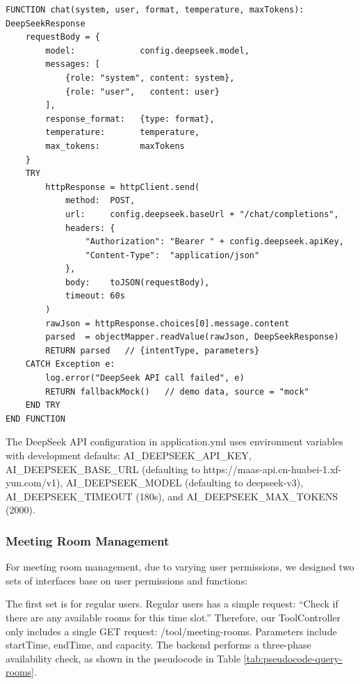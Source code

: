 \vspace{3mm}

\begin{table}[H]
\small\singlespacing
\centering
\caption{Pseudocode --- DeepSeekService.chat() LLM API Call with Fallback}
\label{tab:pseudocode-deepseek-chat}
\vspace{2mm}

\begin{lstlisting}
FUNCTION chat(system, user, format, temperature, maxTokens): DeepSeekResponse
    requestBody = {
        model:             config.deepseek.model,
        messages: [
            {role: "system", content: system},
            {role: "user",   content: user}
        ],
        response_format:   {type: format},
        temperature:       temperature,
        max_tokens:        maxTokens
    }
    TRY
        httpResponse = httpClient.send(
            method:  POST,
            url:     config.deepseek.baseUrl + "/chat/completions",
            headers: {
                "Authorization": "Bearer " + config.deepseek.apiKey,
                "Content-Type":  "application/json"
            },
            body:    toJSON(requestBody),
            timeout: 60s
        )
        rawJson = httpResponse.choices[0].message.content
        parsed  = objectMapper.readValue(rawJson, DeepSeekResponse)
        RETURN parsed   // {intentType, parameters}
    CATCH Exception e:
        log.error("DeepSeek API call failed", e)
        RETURN fallbackMock()   // demo data, source = "mock"
    END TRY
END FUNCTION
\end{lstlisting}
\end{table}


The DeepSeek API configuration in application.yml uses environment variables with development defaults: AI\_DEEPSEEK\_API\_KEY, AI\_DEEPSEEK\_BASE\_URL (defaulting to https://maas-api.cn-huabei-1.xf-yun.com/v1), AI\_DEEPSEEK\_MODEL (defaulting to deepseek-v3), AI\_DEEPSEEK\_TIMEOUT (180s), and AI\_DEEPSEEK\_MAX\_TOKENS (2000).

\subsubsection{Meeting Room Management}

For meeting room management, due to varying user permissions, we designed two sets of interfaces base on user permissions and functions:

The first set is for regular users. Regular users has a simple request: ``Check if there are any available rooms for this time slot.'' Therefore, our ToolController only includes a single GET request: /tool/meeting-rooms. Parameters include startTime, endTime, and capacity. The backend performs a three-phase availability check, as shown in the pseudocode in Table \ref{tab:pseudocode-query-rooms}.

